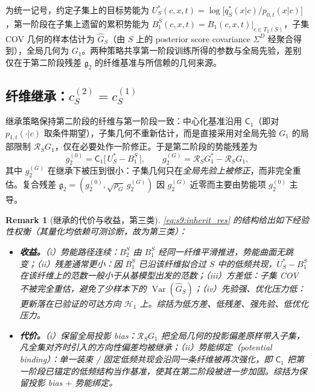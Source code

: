 \documentclass[11pt,a4paper]{article}
\newtheorem{remark}[theorem]{Remark}
\DeclareMathOperator{\Var}{Var}
\newcommand{\cH}{\mathcal{H}}   %
\newcommand{\Rstr}{\mathcal{R}}     %
\newcommand{\Center}{\mathsf{C}}    %
\newcommand{\gres}{\bm{\mathfrak{g}}} %
\begin{document}
\medskip
为统一记号，约定子集上的目标势能为 $U_S^*(c,x,t)=\log\!\big[q_S^*(x|c)/p_{0,t}(x|c)\big]$，第一阶段在子集上遗留的累积势能为 $B_1^S(c,x,t)=B_1(c,x,t)\big|_{c\in T_2(S)}$，子集 COV 几何的样本估计为 $\widehat G_S$（由 $S$ 上的 posterior score covariance $\Sigma^D$ 经聚合得到），全局几何为 $G_1$。两种策略共享第一阶段训练所得的参数与全局先验，差别仅在于第二阶段残差 $\gres_2$ 的纤维基准与所信赖的几何来源。

\subsection{纤维继承：$c_S^{(2)}=c_S^{(1)}$}

继承策略保持第二阶段的纤维与第一阶段一致：中心化基准沿用 $\Center_1$（即对 $p_{1,t}(\cdot|c)$ 取条件期望），子集几何不重新估计，而是直接采用对全局先验 $G_1$ 的局部限制 $\Rstr_S G_1$，仅在必要处作一阶修正。于是第二阶段的势能残差为
\begin{equation}\label{eq:s9:inherit_res}
g_2^{(0)}=\Center_1\!\big[\,U_S^*-B_1^S\,\big],
\qquad
g_2^{(G)}=\Rstr_S G_1^*-\Rstr_S G_1 ,
\end{equation}
其中 $g_2^{(G)}$ 在继承下被压到很小：子集几何只在\emph{全局先验上被修正}，而非完全重估。复合残差 $\gres_2=(g_2^{(0)},\sqrt{\rho_G}\,g_2^{(G)})$ 因 $g_2^{(G)}$ 近零而主要由势能项 $g_2^{(0)}$ 主导。

\begin{remark}[继承的代价与收益，第三类]\label{rem:s9:inherit}
\eqref{eq:s9:inherit_res} 的结构给出如下经验性权衡（其量化均依赖可测诊断，故为第三类）：
\begin{itemize}
\item \textbf{收益。}（i）\emph{势能路径连续}：$B_2^S$ 由 $B_1^S$ 经同一纤维平滑推进，势能曲面无跳变；（ii）\emph{残差通常更小}：因 $B_1^S$ 已沿该纤维拟合过 $S$ 中的低频共现，$U_S^*-B_1^S$ 在该纤维上的范数一般小于从基模型出发的范数；（iii）\emph{方差低}：子集 COV 不被完全重估，避免了少样本下的 $\Var(\widehat G_S)$；（iv）\emph{先验强、优化压力低}：更新落在已验证的可达方向 $\cH_1$ 上。综括为\emph{低方差、低残差、强先验、低优化压力}。
\item \textbf{代价。}（i）\emph{保留全局投影 bias}：$\Rstr_S G_1$ 把全局几何的投影偏差原样带入子集，凡全集对齐时引入的方向性偏差均被继承；（ii）\emph{势能绑定（potential binding）}：单一装束 / 固定低频共现会沿同一条纤维被\emph{再次强化}，即 $\Center_1$ 把第一阶段已锚定的低频结构当作基准，使其在第二阶段被进一步加固。综括为\emph{保留投影 bias $+$ 势能绑定}。
\end{itemize}
\end{remark}
\end{document}
